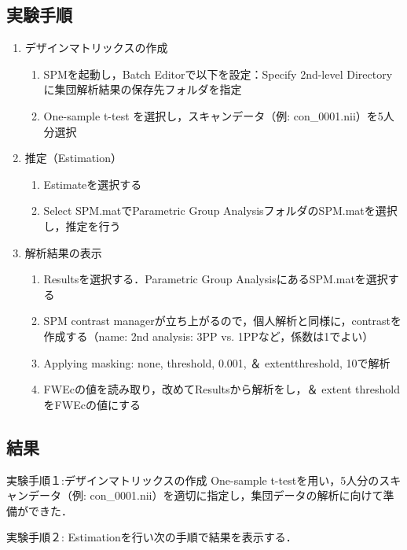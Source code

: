 \documentclass{jlreq}
\begin{document}
\subsection{実験手順}
\begin{enumerate}
    \item デザインマトリックスの作成
        \begin{enumerate}
            \item SPMを起動し，Batch Editorで以下を設定：Specify 2nd-level Directory に集団解析結果の保存先フォルダを指定
            \item One-sample t-test を選択し，スキャンデータ（例: con\_0001.nii）を5人分選択
        \end{enumerate}
    \item 推定（Estimation）
        \begin{enumerate}
            \item Estimateを選択する
            \item Select SPM.matでParametric Group AnalysisフォルダのSPM.matを選択し，推定を行う
        \end{enumerate}
    \item 解析結果の表示
        \begin{enumerate}
            \item Resultsを選択する．Parametric Group AnalysisにあるSPM.matを選択する
            \item SPM contrast managerが立ち上がるので，個人解析と同様に，contrastを作成する（name: 2nd
                analysis: 3PP vs. 1PPなど，係数は1でよい）
            \item Applying masking: none, threshold, 0.001, ＆ extentthreshold, 10で解析
            \item FWEcの値を読み取り，改めてResultsから解析をし，＆ extent thresholdをFWEcの値にする
        \end{enumerate}
\end{enumerate}
\subsection{結果}
実験手順１:デザインマトリックスの作成
One-sample t-testを用い，5人分のスキャンデータ（例: con\_0001.nii）を適切に指定し，集団データの解析に向けて準備ができた．

実験手順２: Estimationを行い次の手順で結果を表示する．
\end{document}
